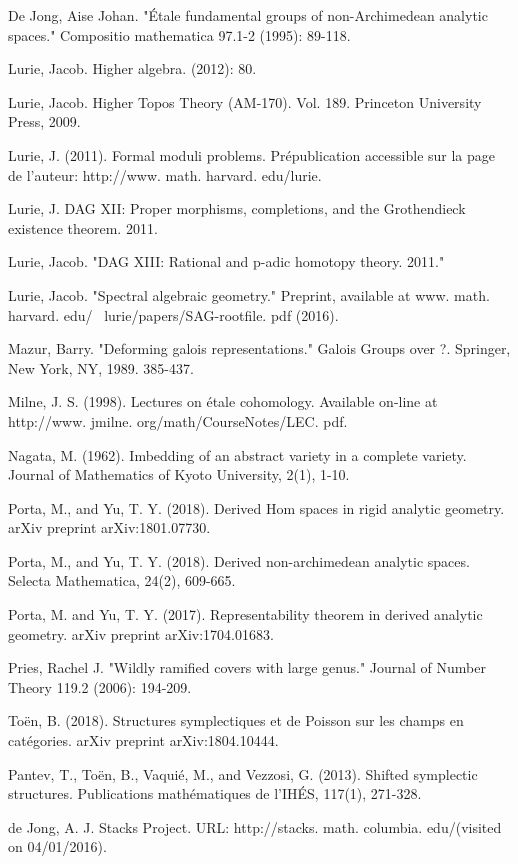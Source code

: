 \documentclass[10pt,a4paper]{amsart}
\numberwithin{equation}{subsection}
\theoremstyle{plain}
\theoremstyle{definition}
\theoremstyle{remark}
\numberwithin{equation}{section}
\begin{document}
\begin{thebibliography}{10}
De Jong, Aise Johan. "\'Etale fundamental groups of non-Archimedean analytic spaces." Compositio mathematica 97.1-2 (1995): 89-118.

Lurie, Jacob. Higher algebra. (2012): 80.

Lurie, Jacob. Higher Topos Theory (AM-170). Vol. 189. Princeton University Press, 2009.

Lurie, J. (2011). Formal moduli problems. Pr\'epublication accessible sur la page de l'auteur: http://www. math. harvard. edu/lurie.

Lurie, J. DAG XII: Proper morphisms, completions, and the Grothendieck existence theorem. 2011.

Lurie, Jacob. "DAG XIII: Rational and p-adic homotopy theory. 2011."

Lurie, Jacob. "Spectral algebraic geometry." Preprint, available at www. math. harvard. edu/~ lurie/papers/SAG-rootfile. pdf (2016).


Mazur, Barry. "Deforming galois representations." Galois Groups over ?. Springer, New York, NY, 1989. 385-437.

Milne, J. S. (1998). Lectures on \'etale cohomology. Available on-line at http://www. jmilne. org/math/CourseNotes/LEC. pdf.

Nagata, M. (1962). Imbedding of an abstract variety in a complete variety. Journal of Mathematics of Kyoto University, 2(1), 1-10.

Porta, M., and Yu, T. Y. (2018). Derived Hom spaces in rigid analytic geometry. arXiv preprint arXiv:1801.07730.

Porta, M., and Yu, T. Y. (2018). Derived non-archimedean analytic spaces. Selecta Mathematica, 24(2), 609-665.

Porta, M. and  Yu, T. Y. (2017). Representability theorem in derived analytic geometry. arXiv preprint arXiv:1704.01683.

Pries, Rachel J. "Wildly ramified covers with large genus." Journal of Number Theory 119.2 (2006): 194-209.

To\"en, B. (2018). Structures symplectiques et de Poisson sur les champs en cat\'egories. arXiv preprint arXiv:1804.10444.

Pantev, T., To\"en, B., Vaqui\'e, M., and Vezzosi, G. (2013). Shifted symplectic structures. Publications math\'ematiques de l'IH\'ES, 117(1), 271-328.

de Jong, A. J. Stacks Project. URL: http://stacks. math. columbia. edu/(visited on 04/01/2016).


\end{thebibliography}
\end{document}
